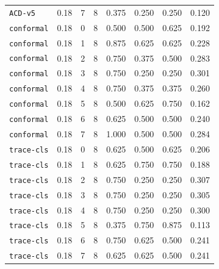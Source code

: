 \documentclass{article}
\begin{document}
\begin{center}
{\begin{tabular}{llllcccc}
\texttt{ACD-v5} & 0.18 & 7 & 8 & 0.375 & 0.250 & 0.250 & 0.120 \\
\texttt{conformal} & 0.18 & 0 & 8 & 0.500 & 0.500 & 0.625 & 0.192 \\
\texttt{conformal} & 0.18 & 1 & 8 & 0.875 & 0.625 & 0.625 & 0.228 \\
\texttt{conformal} & 0.18 & 2 & 8 & 0.750 & 0.375 & 0.500 & 0.283 \\
\texttt{conformal} & 0.18 & 3 & 8 & 0.750 & 0.250 & 0.250 & 0.301 \\
\texttt{conformal} & 0.18 & 4 & 8 & 0.750 & 0.375 & 0.375 & 0.260 \\
\texttt{conformal} & 0.18 & 5 & 8 & 0.500 & 0.625 & 0.750 & 0.162 \\
\texttt{conformal} & 0.18 & 6 & 8 & 0.625 & 0.500 & 0.500 & 0.240 \\
\texttt{conformal} & 0.18 & 7 & 8 & 1.000 & 0.500 & 0.500 & 0.284 \\
\texttt{trace-cls} & 0.18 & 0 & 8 & 0.625 & 0.500 & 0.625 & 0.206 \\
\texttt{trace-cls} & 0.18 & 1 & 8 & 0.625 & 0.750 & 0.750 & 0.188 \\
\texttt{trace-cls} & 0.18 & 2 & 8 & 0.750 & 0.250 & 0.250 & 0.307 \\
\texttt{trace-cls} & 0.18 & 3 & 8 & 0.750 & 0.250 & 0.250 & 0.305 \\
\texttt{trace-cls} & 0.18 & 4 & 8 & 0.750 & 0.250 & 0.250 & 0.300 \\
\texttt{trace-cls} & 0.18 & 5 & 8 & 0.375 & 0.750 & 0.875 & 0.113 \\
\texttt{trace-cls} & 0.18 & 6 & 8 & 0.750 & 0.625 & 0.500 & 0.241 \\
\texttt{trace-cls} & 0.18 & 7 & 8 & 0.625 & 0.625 & 0.500 & 0.241 \\
\bottomrule
\end{tabular}%
}
\end{center}
\end{document}

